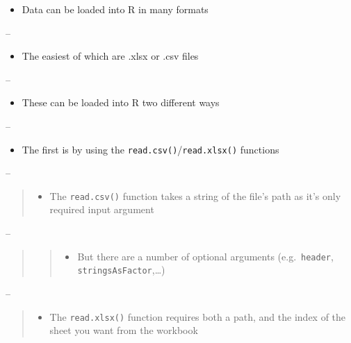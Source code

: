 \documentclass[]{article}
\providecommand{\tightlist}{%
  \setlength{\itemsep}{0pt}\setlength{\parskip}{0pt}}
\begin{document}
\begin{itemize}
\tightlist
\item
  Data can be loaded into R in many formats
\end{itemize}

--

\begin{itemize}
\tightlist
\item
  The easiest of which are .xlsx or .csv files
\end{itemize}

--

\begin{itemize}
\tightlist
\item
  These can be loaded into R two different ways
\end{itemize}

--

\begin{itemize}
\tightlist
\item
  The first is by using the \texttt{read.csv()}/\texttt{read.xlsx()}
  functions
\end{itemize}

--

\begin{quote}
\begin{itemize}
\tightlist
\item
  The \texttt{read.csv()} function takes a string of the file's path as
  it's only required input argument
\end{itemize}
\end{quote}

--

\begin{quote}
\begin{quote}
\begin{itemize}
\tightlist
\item
  But there are a number of optional arguments (e.g.~\texttt{header},
  \texttt{stringsAsFactor},\ldots)
\end{itemize}
\end{quote}
\end{quote}

--

\begin{quote}
\begin{itemize}
\tightlist
\item
  The \texttt{read.xlsx()} function requires both a path, and the index
  of the sheet you want from the workbook
\end{itemize}
\end{quote}
\end{document}
